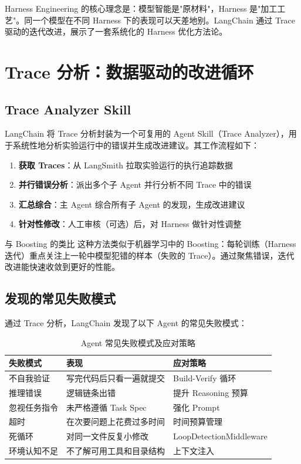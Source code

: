 \documentclass[a4paper]{article}
\begin{document}
Harness Engineering 的核心理念是：模型智能是"原材料"，Harness 是"加工工艺"。同一个模型在不同 Harness 下的表现可以天差地别。LangChain 通过 Trace 驱动的迭代改进，展示了一套系统化的 Harness 优化方法论。


\section{Trace 分析：数据驱动的改进循环}

\subsection{Trace Analyzer Skill}

LangChain 将 Trace 分析封装为一个可复用的 Agent Skill（Trace Analyzer），用于系统性地分析实验运行中的错误并生成改进建议。其工作流程如下：

\begin{enumerate}[leftmargin=2em]
    \item \textbf{获取 Traces}：从 LangSmith 拉取实验运行的执行追踪数据
    \item \textbf{并行错误分析}：派出多个子 Agent 并行分析不同 Trace 中的错误
    \item \textbf{汇总综合}：主 Agent 综合所有子 Agent 的发现，生成改进建议
    \item \textbf{针对性修改}：人工审核（可选）后，对 Harness 做针对性调整
\end{enumerate}

\begin{knowledgebox}{与 Boosting 的类比}
这种方法类似于机器学习中的 Boosting：每轮训练（Harness 迭代）重点关注上一轮中模型犯错的样本（失败的 Trace）。通过聚焦错误，迭代改进能快速收敛到更好的性能。
\end{knowledgebox}

\subsection{发现的常见失败模式}

通过 Trace 分析，LangChain 发现了以下 Agent 的常见失败模式：

\begin{table}[H]
\centering
\caption{Agent 常见失败模式及应对策略}
\begin{tabular}{p{4cm}p{4cm}p{4.5cm}}
\toprule
\textbf{失败模式} & \textbf{表现} & \textbf{应对策略} \\
\midrule
不自我验证 & 写完代码后只看一遍就提交 & Build-Verify 循环 \\
推理错误 & 逻辑链条出错 & 提升 Reasoning 预算 \\
忽视任务指令 & 未严格遵循 Task Spec & 强化 Prompt \\
超时 & 在次要问题上花费过多时间 & 时间预算管理 \\
死循环 & 对同一文件反复小修改 & LoopDetectionMiddleware \\
环境认知不足 & 不了解可用工具和目录结构 & 上下文注入 \\
\bottomrule
\end{tabular}
\end{table}
\end{document}
